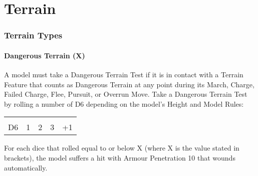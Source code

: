 
\part{Terrain}
\label{terrain}

\RBbmc

\section{Terrain Types}
\label{terrain_types}

\subsection{Dangerous Terrain (X)}
\label{dangerous_terrain}

A model must take a Dangerous Terrain Test if it is in contact with a Terrain Feature that counts as Dangerous Terrain at any point during its March, Charge, Failed Charge, Flee, Pursuit, or Overrun Move. Take a Dangerous Terrain Test by rolling a number of D6 depending on the model's Height and Model Rules:

\vspace*{-2pt}\begin{center}\begin{tabular}{lcccc}%
	\hline
	& \textbf{\heightstandard} & \textbf{\heightlarge} & \textbf{\heightgigantic} & \textbf{\chariot}\tabularnewline
	D6 & 1 & 2 & 3 & +1 \tabularnewline
	\hline
\end{tabular}\end{center}

For each dice that rolled equal to or below X (where X is the value stated in brackets), the model suffers a hit with Armour Penetration 10 that wounds automatically.

